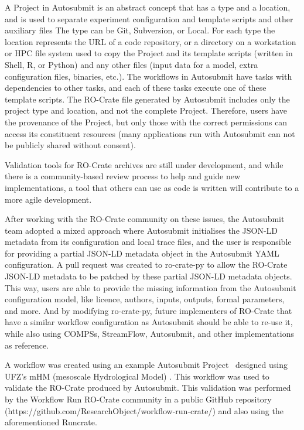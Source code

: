 \documentclass[10pt,letterpaper]{article}
\begin{document}
A Project in Autosubmit is an abstract concept that has a type and a location, and is used to separate experiment configuration and template scripts and other auxiliary files
The type can be Git, Subversion, or Local.
For each type the location represents the URL of a code repository, or a directory on a workstation or HPC file system used to copy the Project and its template scripts (written in Shell, R, or Python) and any other files (input data for a model, extra configuration files, binaries, etc.).
The workflows in Autosubmit have tasks with dependencies to other tasks, and each of these tasks execute one of these template scripts.
The RO-Crate file generated by Autosubmit includes only the project type and location, and not the complete Project.
Therefore, users have the provenance of the Project, but only those with the correct permissions can access its constituent resources (many applications run with Autosubmit can not be publicly shared without consent).

Validation tools for RO-Crate archives are still under development, and while there is a community-based review process to help and guide new implementations, a tool that others can use as code is written will contribute to a more agile development.

After working with the RO-Crate community on these issues, the Autosubmit team adopted a mixed approach where Autosubmit initialises the JSON-LD metadata from its configuration and local trace files, and the user is responsible for providing a partial JSON-LD metadata object in the Autosubmit YAML configuration.
A pull request was created to ro-crate-py to allow the RO-Crate JSON-LD metadata to be patched by these partial JSON-LD metadata objects.
This way, users are able to provide the missing information from the Autosubmit configuration model, like licence, authors, inputs, outputs, formal parameters, and more.
And by modifying ro-crate-py, future implementers of RO-Crate that have a similar workflow configuration as Autosubmit should be able to re-use it, while also using COMPSs, StreamFlow, Autosubmit, and other implementations as reference.

A workflow was created using an example Autosubmit Project~\cite{Kinoshita 2023} designed using UFZ's mHM (mesoscale Hydrological Model)
\cite{Samaniego 2010,Kumar 2013}. This workflow was used to validate the RO-Crate produced by Autosubmit.
This validation was performed by the Workflow Run RO-Crate community in a public GitHub repository (https://github.com/ResearchObject/workflow-run-crate/) and also using the aforementioned Runcrate.
\end{document}
